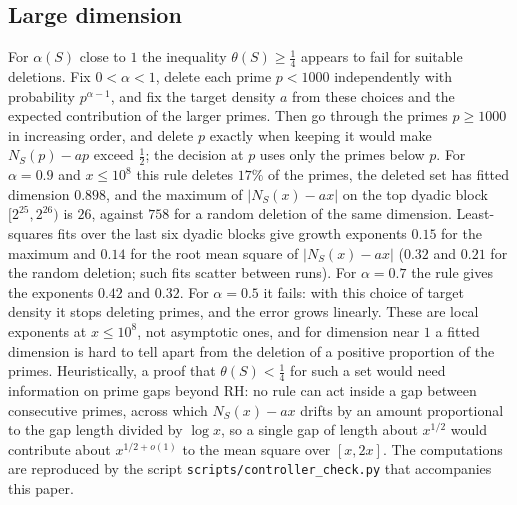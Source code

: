 \documentclass[11pt]{amsart}
\theoremstyle{remark}
\numberwithin{equation}{section}
\begin{document}
\subsection{Large dimension}\label{subsec:largealpha}
For $\alpha(S)$ close to $1$ the inequality $\theta(S)\ge\tfrac14$ appears to fail for suitable deletions. Fix $0<\alpha<1$, delete each prime $p<1000$ independently with probability $p^{\alpha-1}$, and fix the target density $a$ from these choices and the expected contribution of the larger primes. Then go through the primes $p\ge1000$ in increasing order, and delete $p$ exactly when keeping it would make $N_S(p)-ap$ exceed $\tfrac12$; the decision at $p$ uses only the primes below $p$. For $\alpha=0.9$ and $x\le10^8$ this rule deletes $17\%$ of the primes, the deleted set has fitted dimension $0.898$, and the maximum of $|N_S(x)-ax|$ on the top dyadic block $[2^{25},2^{26})$ is $26$, against $758$ for a random deletion of the same dimension. Least-squares fits over the last six dyadic blocks give growth exponents $0.15$ for the maximum and $0.14$ for the root mean square of $|N_S(x)-ax|$ ($0.32$ and $0.21$ for the random deletion; such fits scatter between runs). For $\alpha=0.7$ the rule gives the exponents $0.42$ and $0.32$. For $\alpha=0.5$ it fails: with this choice of target density it stops deleting primes, and the error grows linearly. These are local exponents at $x\le10^8$, not asymptotic ones, and for dimension near $1$ a fitted dimension is hard to tell apart from the deletion of a positive proportion of the primes. Heuristically, a proof that $\theta(S)<\tfrac14$ for such a set would need information on prime gaps beyond RH: no rule can act inside a gap between consecutive primes, across which $N_S(x)-ax$ drifts by an amount proportional to the gap length divided by $\log x$, so a single gap of length about $x^{1/2}$ would contribute about $x^{1/2+o(1)}$ to the mean square over $[x,2x]$. The computations are reproduced by the script \texttt{scripts/controller\_check.py} that accompanies this paper.
\end{document}
